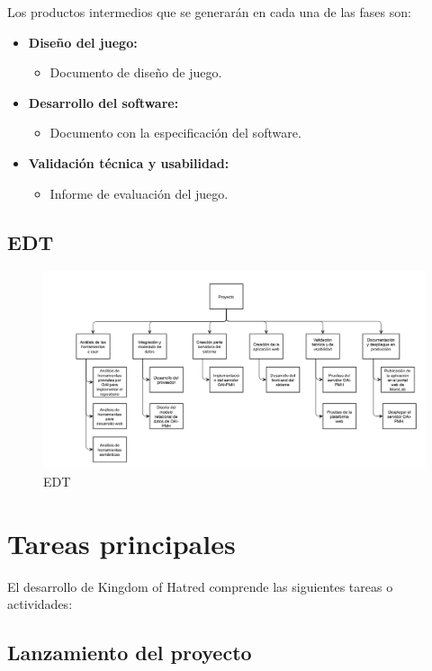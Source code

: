Los productos intermedios que se generarán en cada una de las fases son:

\begin{itemize}
	\item \textbf{Diseño del juego:}
	\begin{itemize}
		\item Documento de diseño de juego.
	\end{itemize}
	\item \textbf{Desarrollo del software:}
	\begin{itemize}
		\item Documento con la especificación del software.
	\end{itemize}
	\item \textbf{Validación técnica y usabilidad:}
	\begin{itemize}
		\item Informe de evaluación del juego.
	\end{itemize}
\end{itemize}

\subsection{EDT}

\begin{figure}[!htp]
	\centering
	\includegraphics[angle=90, scale=.5]{fig/edt}
	\caption{EDT}
\end{figure}

\section{Tareas principales}

El desarrollo de Kingdom of Hatred comprende las siguientes tareas o actividades:

\subsection{Lanzamiento del proyecto}


